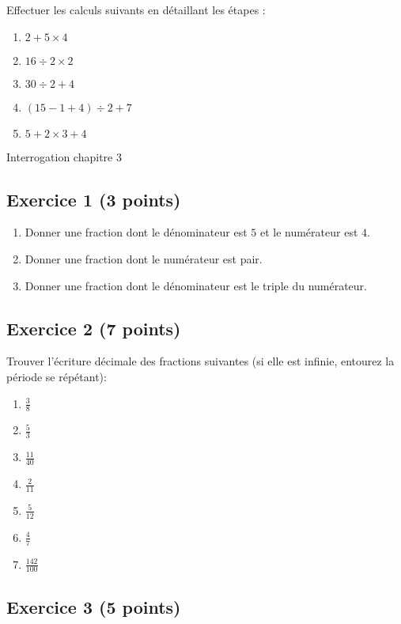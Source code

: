 \documentclass[14 pt]{extarticle}
\theoremstyle{plain}
\begin{document}
 Effectuer les calculs suivants en détaillant les étapes : 
 \begin{enumerate}
 \item $2 + 5 \times 4$
 \item $ 16 \div 2 \times 2$
 \item $ 30 \div 2 + 4$
 \item $ (15 - 1 + 4) \div 2 + 7$
 \item $ 5 + 2 \times 3 + 4$
 \end{enumerate} 
 
\newpage 

\begin{center}{\Large Interrogation chapitre 3}\\ 
 \end{center}
 \subsection*{Exercice 1 (3 points)}
 
 \begin{enumerate}
 \item Donner une fraction dont le dénominateur est $5$ et le numérateur est $4$. 
 \item Donner une fraction dont le numérateur est pair. 
 \item Donner une fraction dont le dénominateur est le triple du numérateur. 
 \end{enumerate}
 
 \subsection*{Exercice 2 (7 points)}
Trouver l'écriture décimale des fractions suivantes (si elle est infinie, entourez la période se répétant): 
\begin{enumerate}
\item $\frac38$
\item $\frac53$
\item $\frac{11}{40}$
\item $\frac2{11}$
\item $\frac5{12}$
\item $\frac47$
\item $\frac{142}{100}$
\end{enumerate}
 \subsection*{Exercice 3 (5 points)}
 
\end{document}
